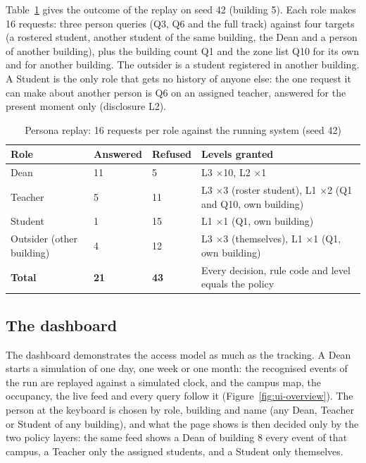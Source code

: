 \documentclass[12pt,a4paper,oneside]{report}
\begin{document}
Table~\ref{tab:replay} gives the outcome of the replay on seed 42 (building 5). Each role makes 16 requests: three person queries (Q3, Q6 and the full track) against four targets (a rostered student, another student of the same building, the Dean and a person of another building), plus the building count Q1 and the zone list Q10 for its own and for another building. The outsider is a student registered in another building. A Student is the only role that gets no history of anyone else: the one request it can make about another person is Q6 on an assigned teacher, answered for the present moment only (disclosure L2).

\begin{table}[htbp]
\centering
\caption{Persona replay: 16 requests per role against the running system (seed 42)}\label{tab:replay}
{\small\setlength{\tabcolsep}{4pt}\renewcommand{\arraystretch}{1.2}
\begin{tabular}{|p{4.2cm}|p{1.9cm}|p{1.9cm}|p{5.6cm}|}\hline
\textbf{Role} & \textbf{Answered} & \textbf{Refused} & \textbf{Levels granted}\\\hline
Dean & 11 & 5 & L3 $\times$10, L2 $\times$1\\\hline
Teacher & 5 & 11 & L3 $\times$3 (roster student), L1 $\times$2 (Q1 and Q10, own building)\\\hline
Student & 1 & 15 & L1 $\times$1 (Q1, own building)\\\hline
Outsider (other building) & 4 & 12 & L3 $\times$3 (themselves), L1 $\times$1 (Q1, own building)\\\hline
\textbf{Total} & \textbf{21} & \textbf{43} & Every decision, rule code and level equals the policy\\\hline
\end{tabular}}
\end{table}

\subsection{The dashboard}\label{sec:res-ui}
The dashboard demonstrates the access model as much as the tracking. A Dean starts a simulation of one day, one week or one month: the recognised events of the run are replayed against a simulated clock, and the campus map, the occupancy, the live feed and every query follow it (Figure~\ref{fig:ui-overview}). The person at the keyboard is chosen by role, building and name (any Dean, Teacher or Student of any building), and what the page shows is then decided only by the two policy layers: the same feed shows a Dean of building 8 every event of that campus, a Teacher only the assigned students, and a Student only themselves.
\end{document}
